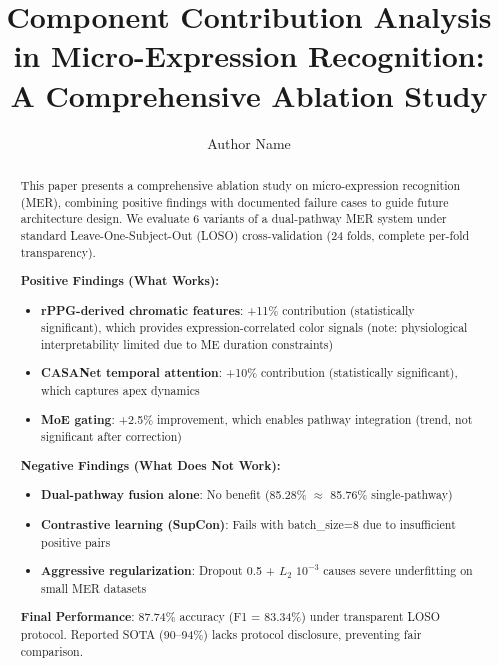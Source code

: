\documentclass[preprint,12pt,authoryear]{elsarticle}
\begin{document}
\begin{frontmatter}

\title{Component Contribution Analysis in Micro-Expression Recognition: A Comprehensive Ablation Study}

\author[TBD]{Author Name}


\begin{abstract}
This paper presents a comprehensive ablation study on micro-expression recognition (MER), combining positive findings with documented failure cases to guide future architecture design. We evaluate 6 variants of a dual-pathway MER system under standard Leave-One-Subject-Out (LOSO) cross-validation (24 folds, complete per-fold transparency).

\textbf{Positive Findings (What Works):}
\begin{itemize}
\item \textbf{rPPG-derived chromatic features}: +11\% contribution (statistically significant), which provides expression-correlated color signals (note: physiological interpretability limited due to ME duration constraints)
\item \textbf{CASANet temporal attention}: +10\% contribution (statistically significant), which captures apex dynamics
\item \textbf{MoE gating}: +2.5\% improvement, which enables pathway integration (trend, not significant after correction)
\end{itemize}

\textbf{Negative Findings (What Does Not Work):}
\begin{itemize}
\item \textbf{Dual-pathway fusion alone}: No benefit (85.28\% $\approx$ 85.76\% single-pathway)
\item \textbf{Contrastive learning (SupCon)}: Fails with batch\_size=8 due to insufficient positive pairs
\item \textbf{Aggressive regularization}: Dropout 0.5 + $L_2$ $10^{-3}$ causes severe underfitting on small MER datasets
\end{itemize}

\textbf{Final Performance}: 87.74\% accuracy (F1 = 83.34\%) under transparent LOSO protocol. Reported SOTA (90--94\%) lacks protocol disclosure, preventing fair comparison.


\end{abstract}
\end{frontmatter}
\end{document}
